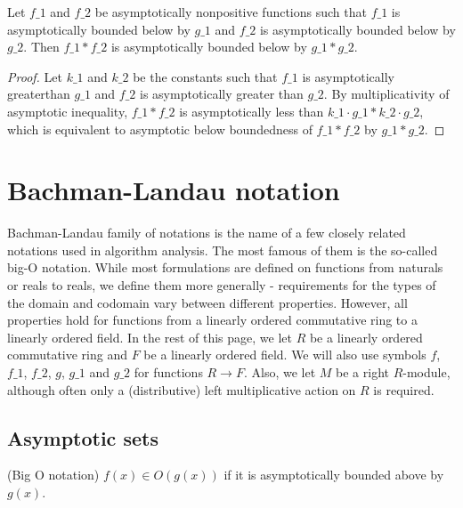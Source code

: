 \begin{lemma}
    \label{lemma:asymp_bounded_below_nonpos_mul}
    \leanok
    Let $f\_1$ and $f\_2$ be asymptotically nonpositive functions such that $f\_1$ 
    is asymptotically bounded below by $g\_1$ and $f\_2$ is asymptotically bounded 
    below by $g\_2$. Then $f\_1 * f\_2$ is asymptotically bounded below by $g\_1 * g\_2$.
\end{lemma}

\begin{proof}
    \leanok
    Let $k\_1$ and $k\_2$ be the constants such that $f\_1$ is asymptotically greaterthan
    $g\_1$ and $f\_2$ is asymptotically greater than $g\_2$. By multiplicativity of asymptotic 
    inequality, $f\_1 * f\_2$ is asymptotically less than $k\_1 \cdot g\_1 * k\_2 \cdot g\_2$,
    which is equivalent to asymptotic below boundedness of $f\_1 * f\_2$ by $g\_1 * g\_2$.
\end{proof}


\chapter{Bachman-Landau notation}

Bachman-Landau family of notations is the name of a few closely related notations used in 
algorithm analysis. The most famous of them is the so-called big-O notation. While
most formulations are defined on functions from naturals or reals to reals, we define 
them more generally - requirements for the types of the domain and codomain vary between 
different properties. However, all properties hold for functions from a linearly ordered 
commutative ring to a linearly ordered field. In the rest of this page, we let $R$ be a linearly 
ordered commutative ring and $F$ be a linearly ordered field. We will also use symbols $f$, 
$f\_1$, $f\_2$, $g$, $g\_1$ and $g\_2$ for functions $R \to F$. Also, we let $M$ be 
a right $R$-module, although often only a (distributive) left multiplicative 
action on $R$ is required.


\section{Asymptotic sets}

\begin{definition}(Big O notation)
    \label{def:big_o}
    \leanok
    $f(x) \in O(g(x))$ if it is asymptotically bounded above by $g(x)$.
\end{definition}

